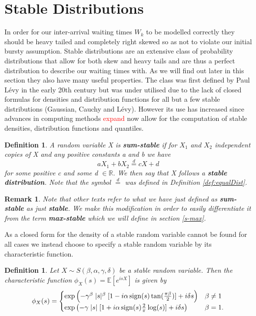 \documentclass[honours,12pt]{UNSWthesis}
\newcommand{\R}{\mathbb{R}}
\newcommand{\E}{\mathbb{E}}
\newcommand{\1}{\mathbf 1}
\newcommand{\sign}{\mathop{\rm sign}}
\newtheorem{definition}[theorem]{Definition}
\newtheorem{remark}[theorem]{Remark}
\numberwithin{equation}{section}
\theoremstyle{definition}
\theoremstyle{remark}
\begin{document}
\section{Stable Distributions}
In order for our inter-arrival waiting times $W_k$ to be modelled correctly they should be heavy tailed and completely right skewed so as not to violate our initial bursty assumption. Stable distributions are an extensive class of probability distributions that allow for both skew and heavy tails and are thus a perfect distribution to describe our waiting times with. As we will find out later in this section they also have many useful properties. The class was first defined by Paul L\'{e}vy in the early 20th century but was under utilised due to the lack of closed formulas for densities and distribution functions for all but a few stable distributions (Gaussian, Cauchy and L\'{e}vy). However its use has increased since advances in computing methods \textcolor{red}{expand} now allow for the computation of stable densities, distribution functions and quantiles.\\
\begin{definition}\cite{jpnolan-stable}
A random variable X is \textbf{sum-stable} if for $X_1$ and $X_2$ independent copies of X and any positive constants a and b we have
\[
	aX_1+bX_2\overset{d}{=}cX+d
\]
for some positive c and some d $\in\R.$ We then say that X follows a \textbf{stable distribution}. Note that the symbol $\overset{d}{=}$ was defined in Definition \ref{def:equalDist}.\\
\end{definition}
\begin{remark}
Note that other texts refer to what we have just defined as \textbf{sum-stable} as just \textbf{stable}. We make this modification in order to easily differentiate it from the term \textbf{max-stable} which we will define in section \ref{s-max}.\\
\end{remark}

\noindent As a closed form for the density of a stable random variable cannot be found for all cases we instead choose to specify a stable random variable by its characteristic function.\\
\begin{definition}\label{def:stableChar}
Let $X\sim S(\beta,\alpha,\gamma,\delta)$ be a stable random variable. Then the characteristic function $\phi_X(s)=\E[e^{isX}]$ is given by
\begin{align}
	\phi_X(s)=\begin{cases}
			\exp\left(-\gamma^\beta \; |s|^\beta \; [1-i\alpha \sign(s)\tan(\frac{\pi\beta}{2})]+i\delta s\right) &\beta\neq1\\
			\exp\left(-\gamma \; |s| \; [1+i\alpha \sign(s)\frac{2}{\pi}\log(s)]+i\delta s\right) &\beta=1.
			\end{cases} 
\end{align}\\
\end{definition}
\end{document}
